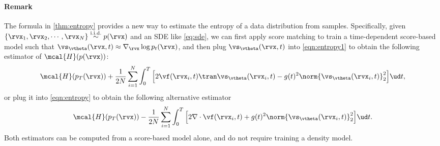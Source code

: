 \paragraph{Remark} The formula in \cref{thm:entropy} provides a new way to estimate the entropy of a data distribution from \iid samples. Specifically, given $\{\rvx_1, \rvx_2, \cdots, \rvx_N\} \stackrel{\text{i.i.d.}}{\sim} p(\rvx)$ and an SDE like \cref{eq:sde}, we can first apply score matching to train a time-dependent score-based model such that $\vs_{\vtheta}(\rvx, t) \approx \nabla_\rvx \log p_t(\rvx)$, and then plug $\vs_{\vtheta}(\rvx, t)$ into \cref{eqn:entropy1} to obtain the following estimator of $\mcal{H}(p(\rvx))$:
\begin{align*}
    \mcal{H}(p_T(\rvx))  + \frac{1}{2N} \sum_{i=1}^N \int_0^T \Big[2 \vf(\rvx_i, t)\tran \vs_\vtheta(\rvx_i, t) - g(t)^2 \norm{\vs_\vtheta(\rvx_i, t)}_2^2\Big]\ud t,
\end{align*}
or plug it into \cref{eqn:entropy} to obtain the following alternative estimator
\begin{align*}
    \mcal{H}(p_T(\rvx))  - \frac{1}{2N} \sum_{i=1}^N \int_0^T \Big[2 \nabla \cdot \vf(\rvx_i, t) + g(t)^2 \norm{\vs_\vtheta(\rvx_i, t)}_2^2\Big]\ud t.
\end{align*}
Both estimators can be computed from a score-based model alone, and do not require training a density model. 

